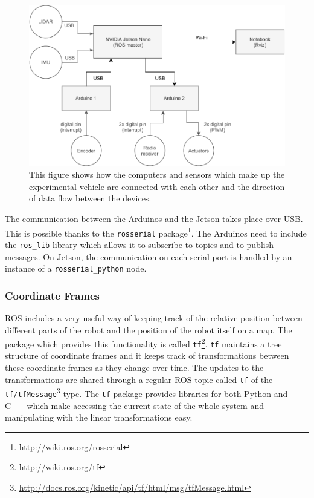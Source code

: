 \begin{figure}
	\centering
	\includegraphics[width=125mm]{../img/ros_diagram}
	\caption{This figure shows how the computers and sensors which make up the experimental vehicle are connected with each other and the direction of data flow between the devices.}
	\label{fig:ros_diagram}
\end{figure}

The communication between the Arduinos and the Jetson takes place over USB. This is possible thanks to the \verb|rosserial| package\footnote{\url{http://wiki.ros.org/rosserial}}. The Arduinos need to include the \verb|ros_lib| library which allows it to subscribe to topics and to publish messages. On Jetson, the communication on each serial port is handled by an instance of a \verb|rosserial_python| node.

\subsubsection{Coordinate Frames}

\Gls{ROS} includes a very useful way of keeping track of the relative position between different parts of the robot and the position of the robot itself on a map. The package which provides this functionality is called \verb|tf|\footnote{\url{http://wiki.ros.org/tf}}. \verb|tf| maintains a tree structure of coordinate frames and it keeps track of transformations between these coordinate frames as they change over time. The updates to the transformations are shared through a regular \gls*{ROS} topic called \verb|tf| of the \texttt{tf/tfMessage}\footnote{\url{http://docs.ros.org/kinetic/api/tf/html/msg/tfMessage.html}} type. The \verb|tf| package provides libraries for both Python and C++ which make accessing the current state of the whole system and manipulating with the linear transformations easy.

